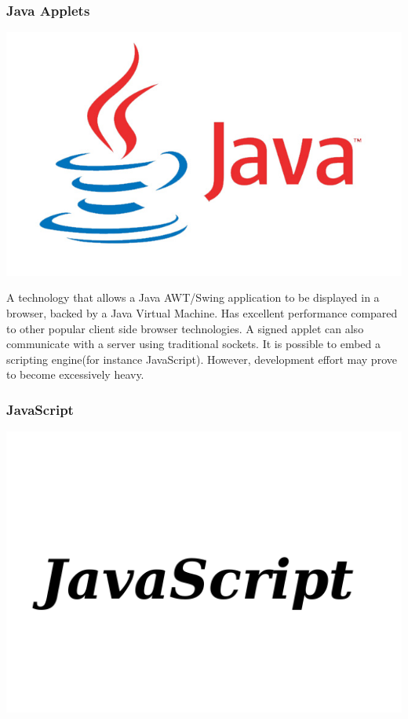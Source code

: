 \subsubsection{Java Applets}

\includegraphics[scale=0.17]{image/java-logo.jpg}

A technology that allows a Java AWT/Swing application to be displayed in a browser, backed by a Java Virtual Machine. Has excellent performance compared to other popular client side browser technologies. A signed applet can also communicate with a server using traditional sockets. It is possible to embed a scripting engine(for instance JavaScript). However, development effort may prove to become excessively heavy.

\subsubsection{JavaScript}

\includegraphics[scale=0.2]{image/javascript-logo.png}

